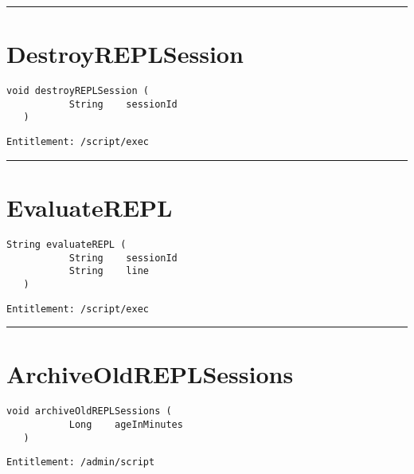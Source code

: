 \rule{12cm}{2pt}
\section{DestroyREPLSession}
\label{Api:DestroyREPLSession}
\begin{lstlisting}[style=nonumbers]
   void destroyREPLSession (
           String    sessionId
   )
\end{lstlisting}
\begin{Verbatim}[formatcom=\color{Maroon}]
  Entitlement: /script/exec
\end{Verbatim}



\rule{12cm}{2pt}
\section{EvaluateREPL}
\label{Api:EvaluateREPL}
\begin{lstlisting}[style=nonumbers]
   String evaluateREPL (
           String    sessionId
           String    line
   )
\end{lstlisting}
\begin{Verbatim}[formatcom=\color{Maroon}]
  Entitlement: /script/exec
\end{Verbatim}



\rule{12cm}{2pt}
\section{ArchiveOldREPLSessions}
\label{Api:ArchiveOldREPLSessions}
\begin{lstlisting}[style=nonumbers]
   void archiveOldREPLSessions (
           Long    ageInMinutes
   )
\end{lstlisting}
\begin{Verbatim}[formatcom=\color{Maroon}]
  Entitlement: /admin/script
\end{Verbatim}



